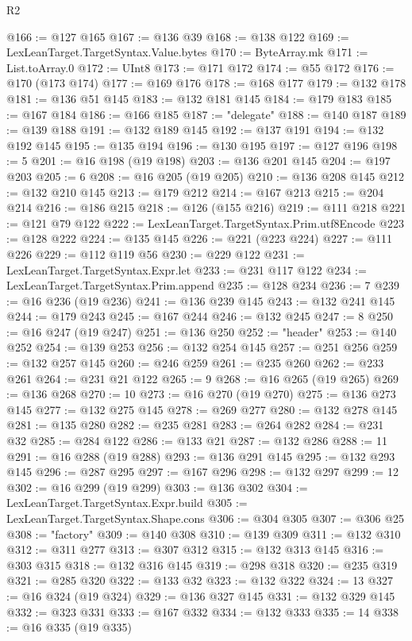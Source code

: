 \begin{lexlean}{R2}
\begin{coremodule}
@166 := @127 @165
@167 := @136 @39
@168 := @138 @122
@169 := LexLeanTarget.TargetSyntax.Value.bytes
@170 := ByteArray.mk
@171 := List.toArray.{0}
@172 := UInt8
@173 := @171 @172
@174 := @55 @172
@176 := @170 (@173 @174)
@177 := @169 @176
@178 := @168 @177
@179 := @132 @178
@181 := @136 @51 @145
@183 := @132 @181 @145
@184 := @179 @183
@185 := @167 @184
@186 := @166 @185
@187 := "delegate"
@188 := @140 @187
@189 := @139 @188
@191 := @132 @189 @145
@192 := @137 @191
@194 := @132 @192 @145
@195 := @135 @194
@196 := @130 @195
@197 := @127 @196
@198 := 5
@201 := @16 @198 (@19 @198)
@203 := @136 @201 @145
@204 := @197 @203
@205 := 6
@208 := @16 @205 (@19 @205)
@210 := @136 @208 @145
@212 := @132 @210 @145
@213 := @179 @212
@214 := @167 @213
@215 := @204 @214
@216 := @186 @215
@218 := @126 (@155 @216)
@219 := @111 @218
@221 := @121 @79 @122
@222 := LexLeanTarget.TargetSyntax.Prim.utf8Encode
@223 := @128 @222
@224 := @135 @145
@226 := @221 (@223 @224)
@227 := @111 @226
@229 := @112 @119 @56
@230 := @229 @122
@231 := LexLeanTarget.TargetSyntax.Expr.let
@233 := @231 @117 @122
@234 := LexLeanTarget.TargetSyntax.Prim.append
@235 := @128 @234
@236 := 7
@239 := @16 @236 (@19 @236)
@241 := @136 @239 @145
@243 := @132 @241 @145
@244 := @179 @243
@245 := @167 @244
@246 := @132 @245
@247 := 8
@250 := @16 @247 (@19 @247)
@251 := @136 @250
@252 := "header"
@253 := @140 @252
@254 := @139 @253
@256 := @132 @254 @145
@257 := @251 @256
@259 := @132 @257 @145
@260 := @246 @259
@261 := @235 @260
@262 := @233 @261
@264 := @231 @21 @122
@265 := 9
@268 := @16 @265 (@19 @265)
@269 := @136 @268
@270 := 10
@273 := @16 @270 (@19 @270)
@275 := @136 @273 @145
@277 := @132 @275 @145
@278 := @269 @277
@280 := @132 @278 @145
@281 := @135 @280
@282 := @235 @281
@283 := @264 @282
@284 := @231 @32
@285 := @284 @122
@286 := @133 @21
@287 := @132 @286
@288 := 11
@291 := @16 @288 (@19 @288)
@293 := @136 @291 @145
@295 := @132 @293 @145
@296 := @287 @295
@297 := @167 @296
@298 := @132 @297
@299 := 12
@302 := @16 @299 (@19 @299)
@303 := @136 @302
@304 := LexLeanTarget.TargetSyntax.Expr.build
@305 := LexLeanTarget.TargetSyntax.Shape.cons
@306 := @304 @305
@307 := @306 @25
@308 := "factory"
@309 := @140 @308
@310 := @139 @309
@311 := @132 @310
@312 := @311 @277
@313 := @307 @312
@315 := @132 @313 @145
@316 := @303 @315
@318 := @132 @316 @145
@319 := @298 @318
@320 := @235 @319
@321 := @285 @320
@322 := @133 @32
@323 := @132 @322
@324 := 13
@327 := @16 @324 (@19 @324)
@329 := @136 @327 @145
@331 := @132 @329 @145
@332 := @323 @331
@333 := @167 @332
@334 := @132 @333
@335 := 14
@338 := @16 @335 (@19 @335)

\end{coremodule}
\end{lexlean}
